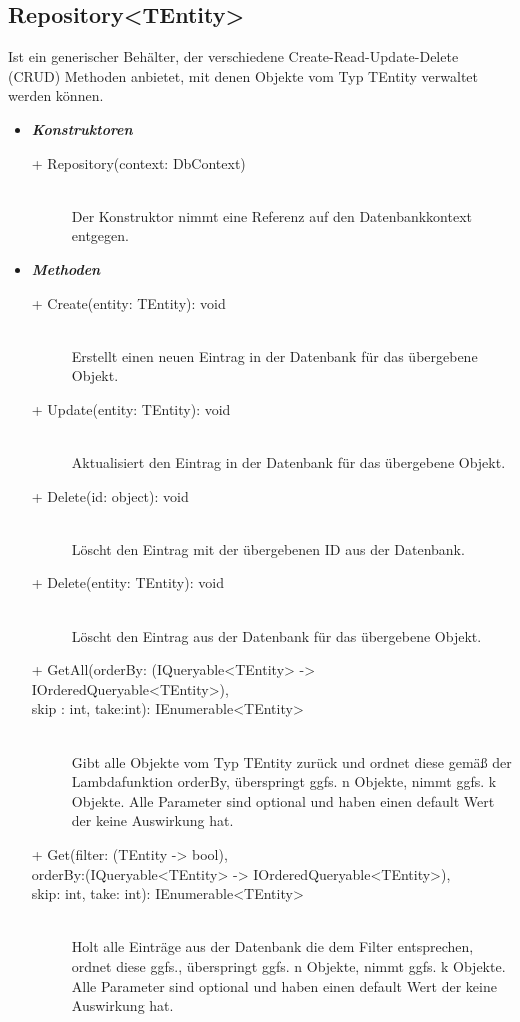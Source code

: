 \documentclass[13pt]{scrreprt}
\begin{document}
	\subsection{Repository<TEntity>}	
	Ist ein generischer Beh\"alter, der verschiedene Create-Read-Update-Delete (CRUD) Methoden anbietet, mit denen Objekte vom Typ TEntity verwaltet werden k\"onnen.
	\begin{itemize}[label = {$\circ$}]
	\item {\large\textbf{\textit{Konstruktoren}}\par}
		\begin{description}
			\item [+ Repository(context: DbContext)] \hfill \\ Der Konstruktor nimmt eine Referenz auf den Datenbankkontext entgegen.
		\end{description}
	\item {\large \textbf{\textit{Methoden}}\par}
		\begin{description}
			\item [+ Create(entity: TEntity): void] \hfill \\ Erstellt einen neuen Eintrag in der Datenbank f\"ur das \"ubergebene Objekt.
			\item [+ Update(entity: TEntity): void] \hfill \\ Aktualisiert den Eintrag in der Datenbank f\"ur das \"ubergebene Objekt.
			\item [+ Delete(id: object): void] \hfill \\ L\"oscht den Eintrag mit der \"ubergebenen ID aus der Datenbank.
			\item [+ Delete(entity: TEntity): void] \hfill \\ L\"oscht den Eintrag aus der Datenbank f\"ur das \"ubergebene Objekt.
			\item [+ GetAll(orderBy: (IQueryable<TEntity> -> IOrderedQueryable<TEntity>),]
			\item[skip : int, take:int): IEnumerable<TEntity>] \hfill \\ Gibt alle Objekte vom Typ TEntity zur\"uck und ordnet diese gem\"aß der Lambdafunktion orderBy, \"uberspringt ggfs. n Objekte, nimmt ggfs. k Objekte. Alle Parameter sind optional und haben einen default Wert der keine Auswirkung hat.
			\item [+ Get(filter: (TEntity -> bool), ]
			\item [orderBy:(IQueryable<TEntity> -> IOrderedQueryable<TEntity>),]
			\item [skip: int, take: int): IEnumerable<TEntity>] \hfill \\ Holt alle Eintr\"age aus der Datenbank die dem Filter entsprechen, ordnet diese ggfs., \"uberspringt ggfs. n Objekte, nimmt ggfs. k Objekte. Alle Parameter sind optional und haben einen default Wert der keine Auswirkung hat.

\end{description}
\end{itemize}
\end{document}
